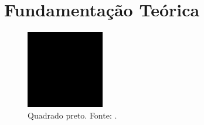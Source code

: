 \chapter{Fundamentação Teórica}%
\label{cap:fundamentacao}

\begin{figure}[!ht]%
    \centering
    \includegraphics[scale=0.5]{img/black-square.png}
    \caption{Quadrado preto. Fonte: \cite{tortinhas}.}%
    \label{fig:f1}
\end{figure}

\lipsum[1-20]
